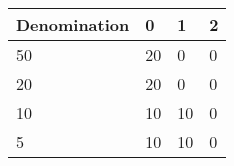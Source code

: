 \begin{tabular}{llll}
Denomination & 0 & 1 & 2 \\ 
\hline 
50 & 20 & 0 & 0 \\ 
20 & 20 & 0 & 0 \\ 
10 & 10 & 10 & 0 \\ 
5 & 10 & 10 & 0 \\ 
\hline 
\end{tabular}
